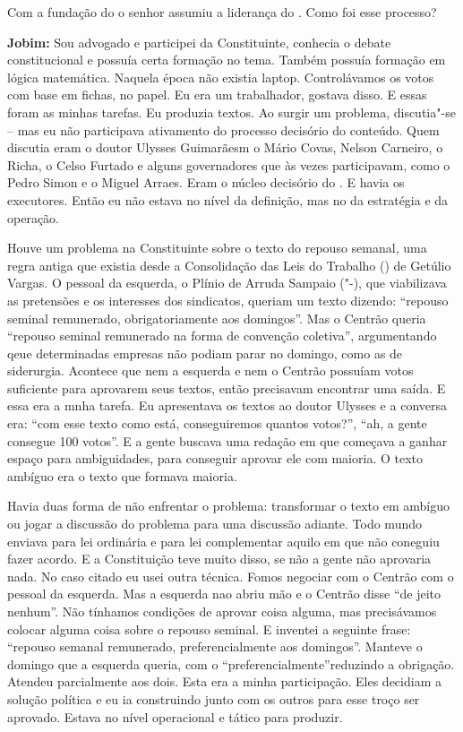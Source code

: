 Com a fundação do  o senhor assumiu a liderança do . Como foi
esse processo?

\textbf{Jobim:} Sou advogado e participei da Constituinte, conhecia o
debate constitucional e possuía certa formação no tema. Também possuía
formação em lógica matemática. Naquela época não existia laptop.
Controlávamos os votos com base em fichas, no papel. Eu era um
trabalhador, gostava disso. E essas foram as minhas tarefas. Eu produzia
textos. Ao surgir um problema, discutia"-se -- mas eu não participava
ativamento do processo decisório do conteúdo. Quem discutia eram o
doutor Ulysses Guimarãesm o Mário Covas, Nelson Carneiro, o Richa, o
Celso Furtado e alguns governadores que às vezes participavam, como o
Pedro Simon e o Miguel Arraes. Eram o núcleo decisório do . E havia
os executores. Então eu não estava no nível da definição, mas no da
estratégia e da operação.

Houve um problema na Constituinte sobre o texto do repouso semanal, uma
regra antiga que existia desde a Consolidação das Leis do Trabalho ()
de Getúlio Vargas. O pessoal da esquerda, o Plínio de Arruda Sampaio
("-), que viabilizava as pretensões e os interesses dos sindicatos,
queriam um texto dizendo: ``repouso seminal remunerado, obrigatoriamente
aos domingos''. Mas o Centrão queria ``repouso seminal remunerado na
forma de convenção coletiva'', argumentando qeue determinadas empresas
não podiam parar no domingo, como as de siderurgia. Acontece que nem a
esquerda e nem o Centrão possuíam votos suficiente para aprovarem seus
textos, então precisavam encontrar uma saída. E essa era a mnha tarefa.
Eu apresentava os textos ao doutor Ulysses e a conversa era: ``com esse
texto como está, conseguiremos quantos votos?'', ``ah, a gente consegue
100 votos''. E a gente buscava uma redação em que começava a ganhar
espaço para ambiguidades, para conseguir aprovar ele com maioria. O
texto ambíguo era o texto que formava maioria.

Havia duas forma de não enfrentar o problema: transformar o texto em
ambíguo ou jogar a discussão do problema para uma discussão adiante.
Todo mundo enviava para lei ordinária e para lei complementar aquilo em
que não coneguiu fazer acordo. E a Constituição teve muito disso, se não
a gente não aprovaria nada. No caso citado eu usei outra técnica. Fomos
negociar com o Centrão com o pessoal da esquerda. Mas a esquerda nao
abriu mão e o Centrão disse ``de jeito nenhum''. Não tínhamos condições
de aprovar coisa alguma, mas precisávamos colocar alguma coisa sobre o
repouso seminal. E inventei a seguinte frase: ``repouso semanal
remunerado, preferencialmente aos domingos''. Manteve o domingo que a
esquerda queria, com o ``preferencialmente''reduzindo a obrigação.
Atendeu parcialmente aos dois. Esta era a minha participação. Eles
decidiam a solução política e eu ia construindo junto com os outros para
esse troço ser aprovado. Estava no nível operacional e tático para
produzir.

